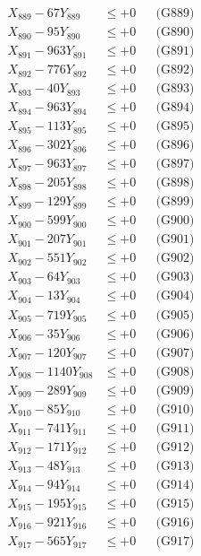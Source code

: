 \documentclass[a4paper,10pt]{article}
\begin{document}
{\begin{align}
X_{889} - 67Y_{889} &\leq +0 && \text{(G889)} \\
X_{890} - 95Y_{890} &\leq +0 && \text{(G890)} \\
\allowbreak
X_{891} - 963Y_{891} &\leq +0 && \text{(G891)} \\
X_{892} - 776Y_{892} &\leq +0 && \text{(G892)} \\
X_{893} - 40Y_{893} &\leq +0 && \text{(G893)} \\
X_{894} - 963Y_{894} &\leq +0 && \text{(G894)} \\
X_{895} - 113Y_{895} &\leq +0 && \text{(G895)} \\
X_{896} - 302Y_{896} &\leq +0 && \text{(G896)} \\
X_{897} - 963Y_{897} &\leq +0 && \text{(G897)} \\
X_{898} - 205Y_{898} &\leq +0 && \text{(G898)} \\
X_{899} - 129Y_{899} &\leq +0 && \text{(G899)} \\
X_{900} - 599Y_{900} &\leq +0 && \text{(G900)} \\
\allowbreak
X_{901} - 207Y_{901} &\leq +0 && \text{(G901)} \\
X_{902} - 551Y_{902} &\leq +0 && \text{(G902)} \\
X_{903} - 64Y_{903} &\leq +0 && \text{(G903)} \\
X_{904} - 13Y_{904} &\leq +0 && \text{(G904)} \\
X_{905} - 719Y_{905} &\leq +0 && \text{(G905)} \\
X_{906} - 35Y_{906} &\leq +0 && \text{(G906)} \\
X_{907} - 120Y_{907} &\leq +0 && \text{(G907)} \\
X_{908} - 1140Y_{908} &\leq +0 && \text{(G908)} \\
X_{909} - 289Y_{909} &\leq +0 && \text{(G909)} \\
X_{910} - 85Y_{910} &\leq +0 && \text{(G910)} \\
\allowbreak
X_{911} - 741Y_{911} &\leq +0 && \text{(G911)} \\
X_{912} - 171Y_{912} &\leq +0 && \text{(G912)} \\
X_{913} - 48Y_{913} &\leq +0 && \text{(G913)} \\
X_{914} - 94Y_{914} &\leq +0 && \text{(G914)} \\
X_{915} - 195Y_{915} &\leq +0 && \text{(G915)} \\
X_{916} - 921Y_{916} &\leq +0 && \text{(G916)} \\
X_{917} - 565Y_{917} &\leq +0 && \text{(G917)} \\

\end{align}}
\end{document}
